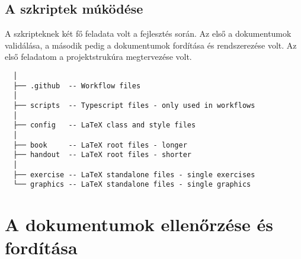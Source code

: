 \subsection{A szkriptek múködése}

A szkripteknek két fő feladata volt a fejlesztés során. Az első a dokumentumok
validálása, a második pedig a dokumentumok fordítása és rendszerezése volt.
Az első feladatom a projektstrukúra megtervezése volt.
\begin{lstlisting}
  │
  ├── .github  -- Workflow files
  │
  ├── scripts  -- Typescript files - only used in workflows
  │
  ├── config   -- LaTeX class and style files
  │
  ├── book     -- LaTeX root files - longer
  ├── handout  -- LaTeX root files - shorter
  │
  ├── exercise -- LaTeX standalone files - single exercises
  └── graphics -- LaTeX standalone files - single graphics
\end{lstlisting}


\section{A dokumentumok ellenőrzése és fordítása}

\cite{github_documentation}

